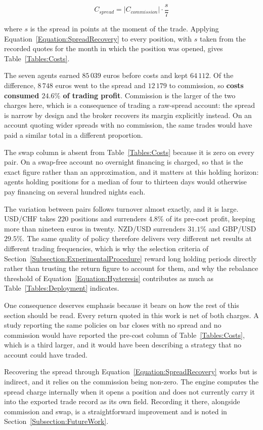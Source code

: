\begin{equation}
C_{spread} = \left| C_{commission} \right| \cdot \frac{s}{7}
\label{Equation:SpreadRecovery}
\end{equation}

where $s$ is the spread in points at the moment of the trade. Applying Equation~\ref{Equation:SpreadRecovery} to every position, with $s$ taken from the recorded quotes for the month in which the position was opened, gives Table~\ref{Tables:Costs}.



The seven agents earned $85\,039$ euros before costs and kept $64\,112$. Of the difference, $8\,748$ euros went to the spread and $12\,179$ to commission, so \textbf{costs consumed $24.6\%$ of trading profit}. Commission is the larger of the two charges here, which is a consequence of trading a raw-spread account: the spread is narrow by design and the broker recovers its margin explicitly instead. On an account quoting wider spreads with no commission, the same trades would have paid a similar total in a different proportion.

The swap column is absent from Table~\ref{Tables:Costs} because it is zero on every pair. On a swap-free account no overnight financing is charged, so that is the exact figure rather than an approximation, and it matters at this holding horizon: agents holding positions for a median of four to thirteen days would otherwise pay financing on several hundred nights each.

The variation between pairs follows turnover almost exactly, and it is large. USD/CHF takes $220$ positions and surrenders $4.8\%$ of its pre-cost profit, keeping more than nineteen euros in twenty. NZD/USD surrenders $31.1\%$ and GBP/USD $29.5\%$. The same quality of policy therefore delivers very different net results at different trading frequencies, which is why the selection criteria of Section~\ref{Subsection:ExperimentalProcedure} reward long holding periods directly rather than trusting the return figure to account for them, and why the rebalance threshold of Equation~\ref{Equation:Hysteresis} contributes as much as Table~\ref{Tables:Deployment} indicates.

One consequence deserves emphasis because it bears on how the rest of this section should be read. Every return quoted in this work is net of both charges. A study reporting the same policies on bar closes with no spread and no commission would have reported the pre-cost column of Table~\ref{Tables:Costs}, which is a third larger, and it would have been describing a strategy that no account could have traded.

Recovering the spread through Equation~\ref{Equation:SpreadRecovery} works but is indirect, and it relies on the commission being non-zero. The engine computes the spread charge internally when it opens a position and does not currently carry it into the exported trade record as its own field. Recording it there, alongside commission and swap, is a straightforward improvement and is noted in Section~\ref{Subsection:FutureWork}.